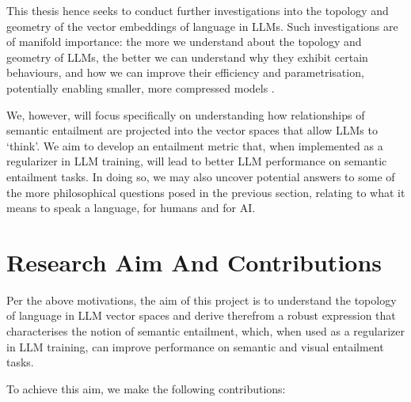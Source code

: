\documentclass[12pt,twoside]{report}
\begin{document}
\par
This thesis hence seeks to conduct further investigations into the topology and geometry of the vector embeddings of language in LLMs. Such investigations are of manifold importance: the more we understand about the topology and geometry of LLMs, the better we can understand why they exhibit certain behaviours, and how we can improve their efficiency and parametrisation, potentially enabling smaller, more compressed models \cite{fitz2024hiddenholestopologicalaspects}. \newline \par

We, however, will focus specifically on understanding how relationships of semantic entailment are projected into the vector spaces that allow LLMs to `think'. We aim to develop an entailment metric that, when implemented as a regularizer in LLM training, will lead to better LLM performance on semantic entailment tasks. In doing so, we may also uncover potential answers to some of the more philosophical questions posed in the previous section, relating to what it means to speak a language, for humans and for AI. 

\section{Research Aim And Contributions}

Per the above motivations, the aim of this project is to understand the topology of language in LLM vector spaces and derive therefrom a robust expression that characterises the notion of semantic entailment, which, when used as a regularizer in LLM training, can improve performance on semantic and visual entailment tasks.  \newline \par

To achieve this aim, we make the following contributions: 
\end{document}
